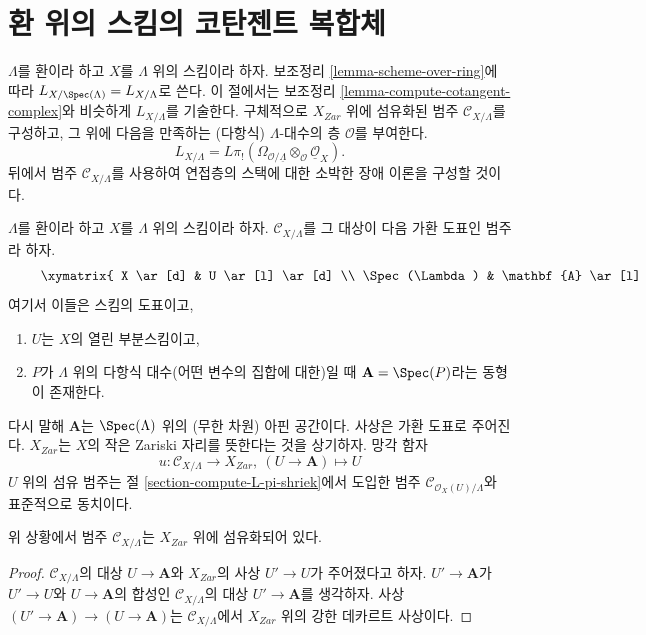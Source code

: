 \section{환 위의 스킴의 코탄젠트 복합체}
\label{section-cotangent-schemes-variant}

\noindent
$\Lambda$를 환이라 하고 $X$를 $\Lambda$ 위의 스킴이라 하자.
보조정리 \ref{lemma-scheme-over-ring}에 따라
$L_{X/\Spec(\Lambda)} = L_{X/\Lambda}$로 쓴다.
이 절에서는 보조정리 \ref{lemma-compute-cotangent-complex}와 비슷하게
$L_{X/\Lambda}$를 기술한다. 구체적으로 $X_{Zar}$ 위에 섬유화된 범주
$\mathcal{C}_{X/\Lambda}$를 구성하고, 그 위에 다음을 만족하는
(다항식) $\Lambda$-대수의 층 $\mathcal{O}$를 부여한다.
$$
L_{X/\Lambda} =
L\pi_!(\Omega_{\mathcal{O}/\underline{\Lambda}} \otimes_\mathcal{O}
\underline{\mathcal{O}}_X).
$$
뒤에서 범주 $\mathcal{C}_{X/\Lambda}$를 사용하여 연접층의 스택에 대한
소박한 장애 이론을 구성할 것이다.

\medskip\noindent
$\Lambda$를 환이라 하고 $X$를 $\Lambda$ 위의 스킴이라 하자.
$\mathcal{C}_{X/\Lambda}$를 그 대상이 다음 가환 도표인 범주라 하자.
\begin{equation}
\label{equation-object}
\vcenter{
\xymatrix{
X \ar[d] & U \ar[l] \ar[d] \\
\Spec(\Lambda) & \mathbf{A} \ar[l]
}
}
\end{equation}
여기서 이들은 스킴의 도표이고,
\begin{enumerate}
\item $U$는 $X$의 열린 부분스킴이고,
\item $P$가 $\Lambda$ 위의 다항식 대수(어떤 변수의 집합에 대한)일 때
$\mathbf{A} = \Spec(P)$라는 동형이 존재한다.
\end{enumerate}
다시 말해 $\mathbf{A}$는 $\Spec(\Lambda)$ 위의 (무한 차원) 아핀 공간이다.
사상은 가환 도표로 주어진다. $X_{Zar}$는 $X$의 작은 Zariski 자리를
뜻한다는 것을 상기하자. 망각 함자
$$
u : \mathcal{C}_{X/\Lambda} \to X_{Zar},\ (U \to \mathbf{A}) \mapsto U
$$
$U$ 위의 섬유 범주는 절 \ref{section-compute-L-pi-shriek}에서 도입한
범주 $\mathcal{C}_{\mathcal{O}_X(U)/\Lambda}$와 표준적으로 동치이다.

\begin{lemma}
\label{lemma-category-fibred}
위 상황에서 범주 $\mathcal{C}_{X/\Lambda}$는 $X_{Zar}$ 위에 섬유화되어 있다.
\end{lemma}

\begin{proof}
$\mathcal{C}_{X/\Lambda}$의 대상 $U \to \mathbf{A}$와 $X_{Zar}$의 사상
$U' \to U$가 주어졌다고 하자. $U' \to \mathbf{A}$가
$U' \to U$와 $U \to \mathbf{A}$의 합성인 $\mathcal{C}_{X/\Lambda}$의 대상
$U' \to \mathbf{A}$를 생각하자. 사상
$(U' \to \mathbf{A}) \to (U \to \mathbf{A})$는
$\mathcal{C}_{X/\Lambda}$에서 $X_{Zar}$ 위의 강한 데카르트 사상이다.
\end{proof}

